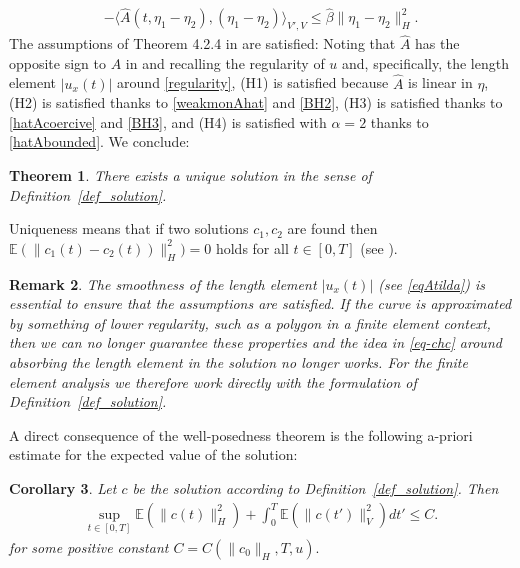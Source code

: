 \documentclass[a4paper,10pt]{article}
\newtheorem{cor}{Corollary}[section]
\newtheorem{teo}[cor]{Theorem}
\newtheorem{rem}[cor]{Remark}
\numberwithin{equation}{section}
\begin{document}
\begin{align}\label{weakmonAhat}
- \langle \hat{A}(t,\eta_{1}-\eta_{2}), (\eta_{1}-\eta_{2}) \rangle_{V',V} \leq \hat{\beta} \| \eta_{1}-\eta_{2}\|_{H}^{2}.
\end{align}
The assumptions of Theorem 4.2.4 in \cite{RoecknerBuch} are satisfied:
Noting that $\hat{A}$ has the opposite sign to $A$ in \cite{RoecknerBuch} and recalling the regularity of $u$ and, specifically, the length element $|u_{x}(t)|$ around \eqref{regularity}, (H1) is satisfied because $\hat{A}$ is linear in $\eta$, (H2) is satisfied thanks to \eqref{weakmonAhat} and \eqref{BH2}, (H3) is satisfied thanks to \eqref{hatAcoercive} and \eqref{BH3}, and (H4) is satisfied with $\alpha = 2$ thanks to \eqref{hatAbounded}. We conclude:

\begin{teo}\label{thm-exc}
There exists a unique solution in the sense of Definition~\ref{def_solution}. 
\end{teo}
Uniqueness means that if two solutions $c_{1},c_{2}$ are found then
$\mathbb{E}(\|c_{1}(t) -c_{2}(t))\|^{2}_{H})=0$ holds for all $t \in [0,T]$ (see \cite[Proposition~4.2.10]{RoecknerBuch}).

\begin{rem}
 The smoothness of the length element $|u_{x}(t)|$ (see \eqref{eqAtilda}) is essential to ensure that the assumptions are satisfied. If the curve is approximated by something of lower regularity, such as a polygon in a finite element context, then we can no longer guarantee these properties and the idea in \eqref{eq-chc} around absorbing the length element in the solution no longer works. For the finite element analysis we therefore work directly with the formulation of Definition~\ref{def_solution}.
\end{rem}



A direct consequence of the well-posedness theorem is the following a-priori estimate for the expected value of the solution:
\begin{cor}\label{c-apriori-est}
Let $c$ be the solution according to Definition~\ref{def_solution}. Then
\begin{align*}
\sup_{ t \in [0,T]} \mathbb{E} (\| c(t)\|^{2}_{H}) + \int_{0}^{T} \mathbb{E}(\| c(t') \|^{2}_{V}) dt' \leq C.
\end{align*}
for some positive constant $C=C(\|c_{0}\|_{H},T,u).$
\end{cor}
\end{document}
